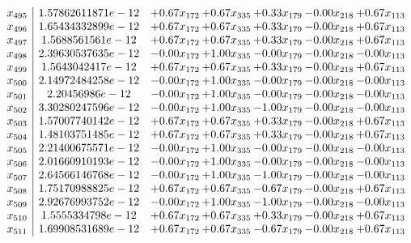 \documentclass[8pt]{article}
\begin{document}
\[\begin{array}{c| c c@{\hskip 2pt} c@{\hskip 2pt} c@{\hskip 2pt} c@{\hskip 2pt} c@{\hskip 2pt} }
 x_{495}   &  1.57862611871e-12 & +  0.67 x_{172} & +  0.67 x_{335} & +  0.33 x_{179} & -0.00 x_{218} & +  0.67 x_{113}\\
 x_{496}   &  1.65434332899e-12 & +  0.67 x_{172} & +  0.67 x_{335} & +  0.33 x_{179} & -0.00 x_{218} & +  0.67 x_{113}\\
 x_{497}   &  1.5688561561e-12 & +  0.67 x_{172} & +  0.67 x_{335} & +  0.33 x_{179} & -0.00 x_{218} & +  0.67 x_{113}\\
 x_{498}   &  2.39630537635e-12 & -0.00 x_{172} & +  1.00 x_{335} & -0.00 x_{179} & -0.00 x_{218} & -0.00 x_{113}\\
 x_{499}   &  1.5643042417e-12 & +  0.67 x_{172} & +  0.67 x_{335} & +  0.33 x_{179} & -0.00 x_{218} & +  0.67 x_{113}\\
 x_{500}   &  2.14972484258e-12 & -0.00 x_{172} & +  1.00 x_{335} & -0.00 x_{179} & -0.00 x_{218} & -0.00 x_{113}\\
 x_{501}   &  2.20456986e-12 & -0.00 x_{172} & +  1.00 x_{335} & -0.00 x_{179} & -0.00 x_{218} & -0.00 x_{113}\\
 x_{502}   &  3.30280247596e-12 & -0.00 x_{172} & +  1.00 x_{335} & -1.00 x_{179} & -0.00 x_{218} & -0.00 x_{113}\\
 x_{503}   &  1.57007740142e-12 & +  0.67 x_{172} & +  0.67 x_{335} & +  0.33 x_{179} & -0.00 x_{218} & +  0.67 x_{113}\\
 x_{504}   &  1.48103751485e-12 & +  0.67 x_{172} & +  0.67 x_{335} & +  0.33 x_{179} & -0.00 x_{218} & +  0.67 x_{113}\\
 x_{505}   &  2.21400675571e-12 & -0.00 x_{172} & +  1.00 x_{335} & -0.00 x_{179} & -0.00 x_{218} & -0.00 x_{113}\\
 x_{506}   &  2.01660910193e-12 & -0.00 x_{172} & +  1.00 x_{335} & -0.00 x_{179} & -0.00 x_{218} & -0.00 x_{113}\\
 x_{507}   &  2.64566146768e-12 & -0.00 x_{172} & +  1.00 x_{335} & -1.00 x_{179} & -0.00 x_{218} & -0.00 x_{113}\\
 x_{508}   &  1.75170988825e-12 & +  0.67 x_{172} & +  0.67 x_{335} & -0.67 x_{179} & -0.00 x_{218} & +  0.67 x_{113}\\
 x_{509}   &  2.92676993752e-12 & -0.00 x_{172} & +  1.00 x_{335} & -1.00 x_{179} & -0.00 x_{218} & -0.00 x_{113}\\
 x_{510}   &  1.5555334798e-12 & +  0.67 x_{172} & +  0.67 x_{335} & +  0.33 x_{179} & -0.00 x_{218} & +  0.67 x_{113}\\
 x_{511}   &  1.69908531689e-12 & +  0.67 x_{172} & +  0.67 x_{335} & -0.67 x_{179} & -0.00 x_{218} & +  0.67 x_{113}\\

\end{array}\]
\end{document}
